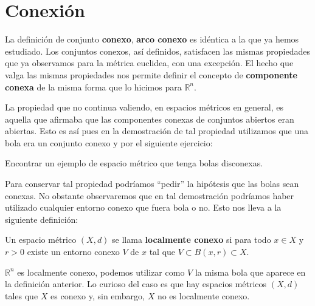 \section{Conexión}La definición de conjunto \textbf{conexo},
\textbf{arco conexo} es idéntica a la que ya hemos estudiado. Los
conjuntos conexos, así definidos, satisfacen las mismas
propiedades que ya observamos para la métrica euclidea, con una
excepción. El hecho que valga las mismas propiedades nos permite
definir el concepto de \textbf{componente conexa} de la misma
forma que lo hicimos para $\mathbb{R}^n$.

La propiedad que no continua valiendo, en espacios métricos en
general, es aquella que afirmaba que las componentes conexas de
conjuntos abiertos eran abiertas. Esto es así pues en la
demostración de tal propiedad utilizamos que una bola era un
conjunto conexo y por el siguiente ejercicio:

\begin{ejercicio}{} Encontrar un ejemplo de espacio métrico que
tenga bolas disconexas.
\end{ejercicio}

Para conservar tal propiedad podríamos ``pedir'' la hipótesis que
las bolas sean conexas. No obstante observaremos que en tal demostración
podríamos haber utilizado cualquier entorno conexo que fuera bola o no.
Esto nos lleva a la siguiente definición:

\begin{definicion}{} Un espacio métrico $(X,d)$ se llama
\textbf{localmente conexo} si para todo $x\in X$ y $r>0$
existe un entorno conexo $V$ de $x$ tal que $V\subset B(x,r)\subset X$.
\end{definicion}

$\mathbb{R}^n$ es localmente conexo, podemos utilizar como $V$ la
 misma bola que aparece en la definición anterior. Lo curioso del
 caso es que hay espacios métricos $(X,d)$ tales que $X$ es conexo
 y, sin embargo, $X$ no es localmente conexo.

